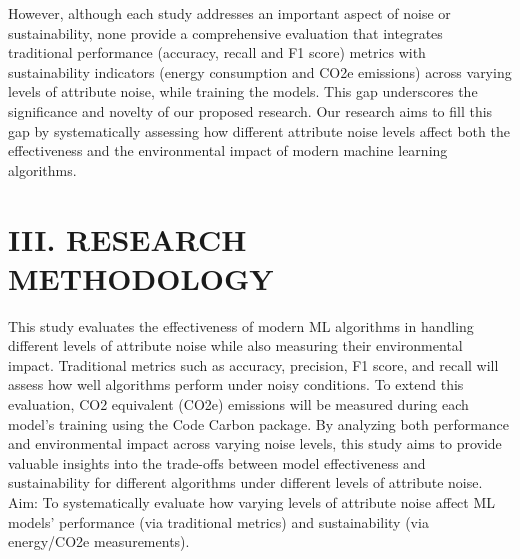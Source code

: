 \documentclass[conference]{IEEEtran}
\begin{document}
\newline
\newline
However, although each study addresses an important aspect of noise or sustainability, none provide a comprehensive evaluation that integrates traditional performance (accuracy, recall and F1 score) metrics with sustainability indicators (energy consumption and CO2e emissions) across varying levels of attribute noise, while training the models. This gap underscores the significance and novelty of our proposed research. Our research aims to fill this gap by systematically assessing how different attribute noise levels affect both the effectiveness and the environmental impact of modern machine learning algorithms.


\section*{III. RESEARCH METHODOLOGY}
This study evaluates the effectiveness of modern ML algorithms in handling different levels of attribute noise while also measuring their environmental impact. Traditional metrics such as accuracy, precision, F1 score, and recall will assess how well algorithms perform under noisy conditions. To extend this evaluation, CO2 equivalent (CO2e) emissions will be measured during each model's training using the Code Carbon package. By analyzing both performance and environmental impact across varying noise levels, this study aims to provide valuable insights into the trade-offs between model effectiveness and sustainability for different algorithms under different levels of attribute noise.
\newline
\newline
Aim: To systematically evaluate how varying levels of attribute noise affect ML models' performance (via traditional metrics) and sustainability (via energy/CO2e measurements).
\newline
\end{document}
